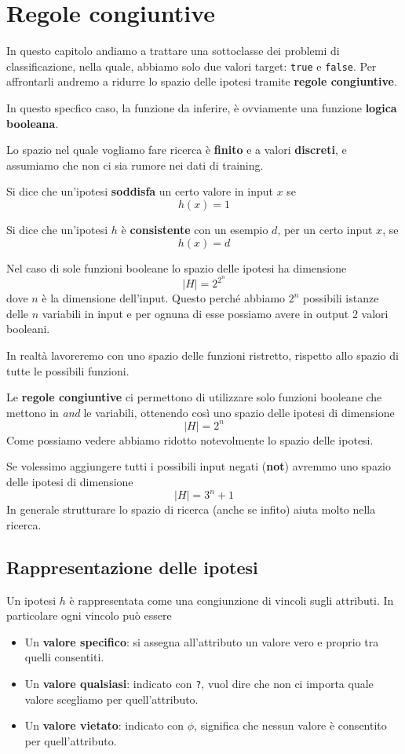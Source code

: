 \chapter{Regole congiuntive}
In questo capitolo andiamo a trattare una sottoclasse dei problemi di classificazione, nella quale, abbiamo solo due valori
target: \verb|true| e \verb|false|. Per affrontarli andremo a ridurre lo spazio delle ipotesi tramite
\textbf{regole congiuntive}.

In questo specfico caso, la funzione da inferire, \`e ovviamente una funzione \textbf{logica booleana}.

Lo spazio nel quale vogliamo fare ricerca \`e \textbf{finito} e a valori \textbf{discreti}, e assumiamo che non ci sia rumore
nei dati di training.

\begin{definition}
	Si dice che un'ipotesi \textbf{soddisfa} un certo valore in input $x$ se
	\[ h(x) = 1 \]
\end{definition}

\begin{definition}\label{def: consistente}
	Si dice che un'ipotesi $h$ \`e \textbf{consistente} con un esempio $d$, per un certo input $x$, se
	\[ h(x) = d \]
\end{definition}

Nel caso di sole funzioni booleane lo spazio delle ipotesi ha dimensione
\[ |H| = 2^{2^n} \]
dove $n$ \`e la dimensione dell'input. Questo perch\'e abbiamo $2^n$ possibili istanze delle $n$ variabili in input e
per ognuna di esse possiamo avere in output 2 valori booleani.

In realt\`a lavoreremo con uno spazio delle funzioni ristretto, rispetto allo spazio di tutte le
possibili funzioni.

Le \textbf{regole congiuntive} ci permettono di utilizzare solo funzioni booleane che mettono in \emph{and} le
variabili, ottenendo cos\`i uno spazio delle ipotesi di dimensione
\[ |H| = 2^n \]
Come possiamo vedere abbiamo ridotto notevolmente lo spazio delle ipotesi.

Se volessimo aggiungere tutti i possibili input negati (\textbf{not}) avremmo uno spazio delle ipotesi di dimensione
\[ |H| = 3^n + 1 \]
In generale strutturare lo spazio di ricerca (anche se infito) aiuta molto nella ricerca.

\section{Rappresentazione delle ipotesi}
Un ipotesi $h$ \`e rappresentata come una congiunzione di vincoli sugli attributi. In particolare ogni vincolo pu\`o
essere
\begin{itemize}
	\item Un \textbf{valore specifico}: si assegna all'attributo un valore vero e proprio tra quelli consentiti.
	\item Un \textbf{valore qualsiasi}: indicato con \verb|?|, vuol dire che non ci importa quale valore
	      scegliamo per quell'attributo.
	\item Un \textbf{valore vietato}: indicato con $\phi$, significa che nessun valore \`e consentito per quell'attributo.
\end{itemize}

